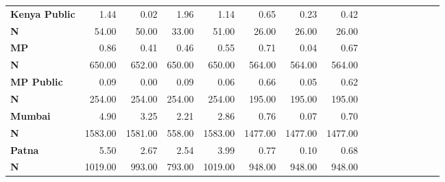 \begin{tabular}{@{\extracolsep{5pt}}lrrrrrrrrrrrrrrr}
{\bf Kenya Public} & 1.44\phantom{***} & 0.02\phantom{***} & 1.96\phantom{***} & 1.14\phantom{***} & 0.65\phantom{***} & 0.23\phantom{***} & 0.42\phantom{***} \\
{\bf N} & 54.00\phantom{***} & 50.00\phantom{***} & 33.00\phantom{***} & 51.00\phantom{***} & 26.00\phantom{***} & 26.00\phantom{***} & 26.00\phantom{***} \\
{\bf MP} & 0.86\phantom{***} & 0.41\phantom{***} & 0.46\phantom{***} & 0.55\phantom{***} & 0.71\phantom{***} & 0.04\phantom{***} & 0.67\phantom{***} \\
{\bf N} & 650.00\phantom{***} & 652.00\phantom{***} & 650.00\phantom{***} & 650.00\phantom{***} & 564.00\phantom{***} & 564.00\phantom{***} & 564.00\phantom{***} \\
{\bf MP Public} & 0.09\phantom{***} & 0.00\phantom{***} & 0.09\phantom{***} & 0.06\phantom{***} & 0.66\phantom{***} & 0.05\phantom{***} & 0.62\phantom{***} \\
{\bf N} & 254.00\phantom{***} & 254.00\phantom{***} & 254.00\phantom{***} & 254.00\phantom{***} & 195.00\phantom{***} & 195.00\phantom{***} & 195.00\phantom{***} \\
{\bf Mumbai} & 4.90\phantom{***} & 3.25\phantom{***} & 2.21\phantom{***} & 2.86\phantom{***} & 0.76\phantom{***} & 0.07\phantom{***} & 0.70\phantom{***} \\
{\bf N} & 1583.00\phantom{***} & 1581.00\phantom{***} & 558.00\phantom{***} & 1583.00\phantom{***} & 1477.00\phantom{***} & 1477.00\phantom{***} & 1477.00\phantom{***} \\
{\bf Patna} & 5.50\phantom{***} & 2.67\phantom{***} & 2.54\phantom{***} & 3.99\phantom{***} & 0.77\phantom{***} & 0.10\phantom{***} & 0.68\phantom{***} \\
{\bf N} & 1019.00\phantom{***} & 993.00\phantom{***} & 793.00\phantom{***} & 1019.00\phantom{***} & 948.00\phantom{***} & 948.00\phantom{***} & 948.00\phantom{***} \\
\hline
\end{tabular}

